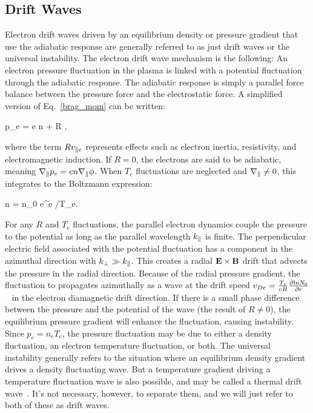 \subsection{Drift Waves}
\label{ss_drift_waves}

Electron drift waves driven by an equilibrium density or pressure gradient that use the adiabatic response are generally referred to as just drift waves or the universal instability.
The electron drift wave mechanism is the following: An electron pressure fluctuation in the plasma is linked with a potential fluctuation through the adiabatic response. The adiabatic
response is simply a parallel force balance between the pressure force and the electrostatic force. A simplified version of Eq.~\ref{brag_mom} can be written:

\beq
\label{adiabatic_response}
\gradpar p_e = e n \gradpar \phi + R \vpe,
\eeq

where the term $R v_{\parallel e}$ represents effects such as electron inertia, resistivity, and electromagnetic induction. If $R=0$, the electrons are said to be adiabatic, meaning 
$\nabla_\parallel p_e = e n \nabla_\parallel \phi$. When $T_e$ fluctuations are neglected and $\nabla_\parallel \ne 0$, this integrates to the Boltzmann expression:

\beq
\label{boltzmann_exp}
n = n_0 e^{e \phi/T_e}.
\eeq

For any $R$ and $T_e$ fluctuations, the parallel electron dynamics couple the pressure to the potential as long as the parallel wavelength $k_\parallel$ is finite. 
The perpendicular electric field associated with the potential fluctuation has a component in the azimuthal direction with $k_\perp \gg k_\parallel$. 
This creates a radial ${\bf E \times B}$ drift that advects the pressure in the radial direction. Because of the radial pressure gradient,
the fluctuation to propagates azimuthally as a wave at the drift speed $v_{De} = \frac{T_e}{e B} \frac{\partial{\rm ln} N_0}{\partial r}$~\cite{chen2006} in the electron diamagnetic drift direction. 
If there is a small phase difference between the pressure and the potential of the wave (the result of $R \ne 0$), the equilibrium pressure gradient will enhance the fluctuation, causing
instability. Since $p_e = n_e T_e$, the pressure fluctuation may be due to either a density fluctuation, an electron temperature fluctuation, or both. The universal instability generally
refers to the situation where an equilibrium density gradient drives a density fluctuating wave. But a temperature gradient driving a temperature fluctuation wave is also possible, and
may be called a thermal drift wave~\cite{makwana2011}. It's not necessary, however, to separate them, and we will just refer to both of these as drift waves.

